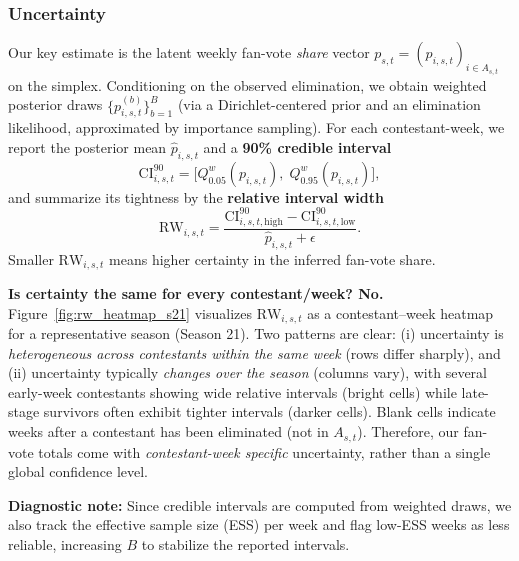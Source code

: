 \documentclass[12pt]{article}
\begin{document}
\subsubsection{Uncertainty}

Our key estimate is the latent weekly fan-vote \emph{share} vector
$p_{s,t}=(p_{i,s,t})_{i\in A_{s,t}}$ on the simplex.
Conditioning on the observed elimination, we obtain weighted posterior draws
$\{p^{(b)}_{i,s,t}\}_{b=1}^{B}$ (via a Dirichlet-centered prior and an elimination likelihood, approximated by importance sampling).
For each contestant-week, we report the posterior mean $\hat p_{i,s,t}$ and a \textbf{90\% credible interval}
\begin{equation}
\mathrm{CI}^{90}_{i,s,t}=\Big[Q^{w}_{0.05}(p_{i,s,t}),\;Q^{w}_{0.95}(p_{i,s,t})\Big],
\end{equation}
and summarize its tightness by the \textbf{relative interval width}
\begin{equation}
\mathrm{RW}_{i,s,t}=\frac{\mathrm{CI}^{90}_{i,s,t,\mathrm{high}}-\mathrm{CI}^{90}_{i,s,t,\mathrm{low}}}{\hat p_{i,s,t}+\epsilon}.
\end{equation}
Smaller $\mathrm{RW}_{i,s,t}$ means higher certainty in the inferred fan-vote share.

\textbf{Is certainty the same for every contestant/week? No.}
Figure~\ref{fig:rw_heatmap_s21} visualizes $\mathrm{RW}_{i,s,t}$ as a contestant--week heatmap for a representative season (Season 21).
Two patterns are clear: (i) uncertainty is \emph{heterogeneous across contestants within the same week} (rows differ sharply), and
(ii) uncertainty typically \emph{changes over the season} (columns vary), with several early-week contestants showing wide relative intervals
(bright cells) while late-stage survivors often exhibit tighter intervals (darker cells).
Blank cells indicate weeks after a contestant has been eliminated (not in $A_{s,t}$).
Therefore, our fan-vote totals come with \emph{contestant-week specific} uncertainty, rather than a single global confidence level.

\textbf{Diagnostic note: }
Since credible intervals are computed from weighted draws, we also track the effective sample size (ESS) per week and flag low-ESS weeks as less reliable, increasing $B$ to stabilize the reported intervals.
\end{document}
